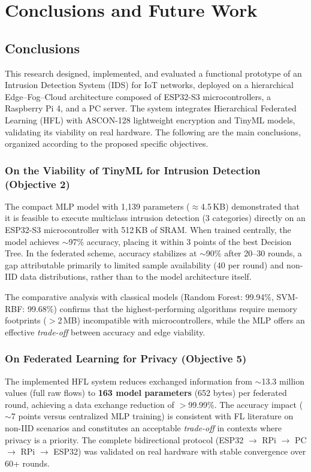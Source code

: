 \chapter{Conclusions and Future Work}
\label{chap:conc}

\section{Conclusions}

This research designed, implemented, and evaluated a functional prototype of an Intrusion Detection System (IDS) for IoT networks, deployed on a hierarchical Edge--Fog--Cloud architecture composed of ESP32-S3 microcontrollers, a Raspberry Pi 4, and a PC server. The system integrates Hierarchical Federated Learning (HFL) with ASCON-128 lightweight encryption and TinyML models, validating its viability on real hardware. The following are the main conclusions, organized according to the proposed specific objectives.

\subsection{On the Viability of TinyML for Intrusion Detection (Objective 2)}

The compact MLP model with 1,139 parameters ($\approx$4.5\,KB) demonstrated that it is feasible to execute multiclass intrusion detection (3 categories) directly on an ESP32-S3 microcontroller with 512\,KB of SRAM. When trained centrally, the model achieves $\sim$97\% accuracy, placing it within 3 points of the best Decision Tree. In the federated scheme, accuracy stabilizes at $\sim$90\% after 20--30 rounds, a gap attributable primarily to limited sample availability (40 per round) and non-IID data distributions, rather than to the model architecture itself.

The comparative analysis with classical models (Random Forest: 99.94\%, SVM-RBF: 99.68\%) confirms that the highest-performing algorithms require memory footprints ($>$2\,MB) incompatible with microcontrollers, while the MLP offers an effective \emph{trade-off} between accuracy and edge viability.

\subsection{On Federated Learning for Privacy (Objective 5)}

The implemented HFL system reduces exchanged information from $\sim$13.3 million values (full raw flows) to \textbf{163 model parameters} (652 bytes) per federated round, achieving a data exchange reduction of $>$99.99\%. The accuracy impact ($\sim$7 points versus centralized MLP training) is consistent with FL literature on non-IID scenarios and constitutes an acceptable \emph{trade-off} in contexts where privacy is a priority. The complete bidirectional protocol (ESP32 $\to$ RPi $\to$ PC $\to$ RPi $\to$ ESP32) was validated on real hardware with stable convergence over 60+ rounds.

